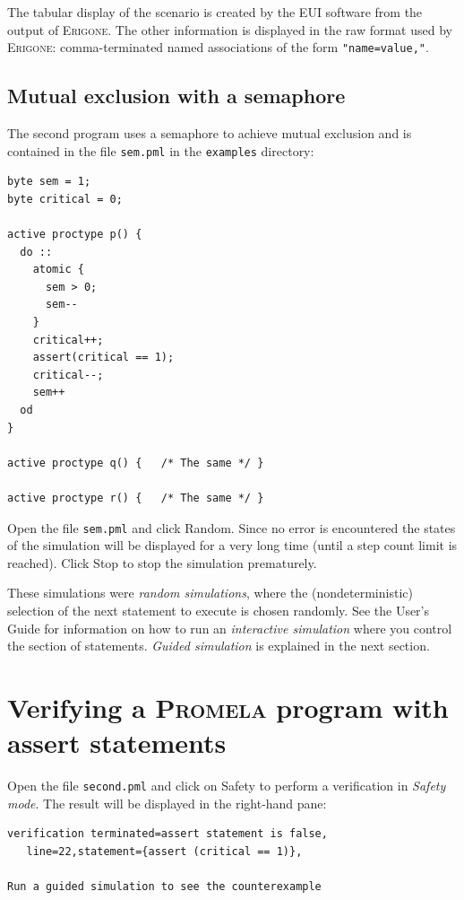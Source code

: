 \documentclass[11pt]{article}
\newcommand*{\prg}{\textsc{Erigone}}
\newcommand*{\eui}{\textsc{EUI}}
\newcommand*{\prm}{\textsc{Promela}}
\newcommand*{\p}[1]{\texttt{#1}}
\newcommand*{\bu}[1]{\textsf{#1}}
\begin{document}
The tabular display of the scenario is created by the \eui{} software
from the output of \prg{}. The other information is displayed in the raw
format used by \prg{}: comma-terminated named associations of the form
\p{"name=value,"}.

\subsection*{Mutual exclusion with a semaphore}

The second program uses a semaphore to achieve mutual exclusion
and is contained in the file \p{sem.pml} in the \p{examples} directory:

\pagebreak[4]

\begin{verbatim}
byte sem = 1;
byte critical = 0;

active proctype p() {	
  do :: 
    atomic {
      sem > 0;
      sem--
    }
    critical++;
    assert(critical == 1);
    critical--;
    sem++
  od
}

active proctype q() {	/* The same */ }

active proctype r() {	/* The same */ }	
\end{verbatim}

Open the file \p{sem.pml} and click \bu{Random}. Since no error is
encountered the states of the simulation will be displayed for a very
long time (until a step count limit is reached). Click \bu{Stop} to stop
the simulation prematurely.

These simulations were \emph{random simulations}, where the
(nondeterministic) selection of the next statement to execute is chosen
randomly. See the User's Guide for information on how to run an
\emph{interactive simulation} where you control the section of
statements. \emph{Guided simulation} is explained in the next section.

\section{Verifying a \prm{} program with assert statements}

Open the file \p{second.pml} and click on \bu{Safety} to perform a
verification in \emph{Safety mode}. The result will be displayed in the
right-hand pane:
\begin{verbatim}
verification terminated=assert statement is false,
   line=22,statement={assert (critical == 1)},

Run a guided simulation to see the counterexample
\end{verbatim}
\end{document}
